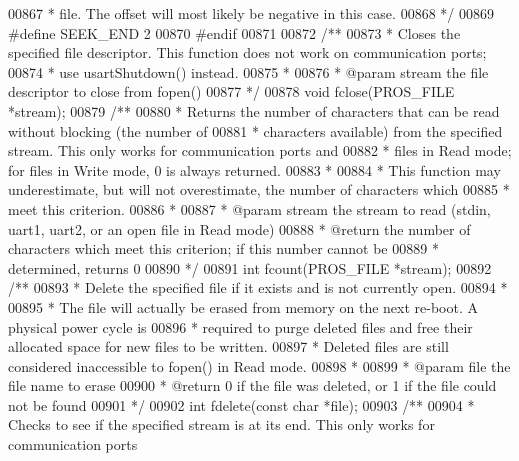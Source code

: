 \begin{DoxyCode}
00867 \textcolor{comment}{ * file. The offset will most likely be negative in this case.}
00868 \textcolor{comment}{ */}
00869 \textcolor{preprocessor}{#}\textcolor{preprocessor}{define}       \textcolor{preprocessor}{SEEK\_END} 2
00870 \textcolor{preprocessor}{#}\textcolor{preprocessor}{endif}
00871 
00872 \textcolor{comment}{/**}
00873 \textcolor{comment}{ * Closes the specified file descriptor. This function does not work on communication ports;}
00874 \textcolor{comment}{ * use usartShutdown() instead.}
00875 \textcolor{comment}{ *}
00876 \textcolor{comment}{ * @param stream the file descriptor to close from fopen()}
00877 \textcolor{comment}{ */}
00878 \textcolor{keywordtype}{void} fclose(PROS_FILE *stream);
00879 \textcolor{comment}{/**}
00880 \textcolor{comment}{ * Returns the number of characters that can be read without blocking (the number of}
00881 \textcolor{comment}{ * characters available) from the specified stream. This only works for communication ports and}
00882 \textcolor{comment}{ * files in Read mode; for files in Write mode, 0 is always returned.}
00883 \textcolor{comment}{ *}
00884 \textcolor{comment}{ * This function may underestimate, but will not overestimate, the number of characters which}
00885 \textcolor{comment}{ * meet this criterion.}
00886 \textcolor{comment}{ *}
00887 \textcolor{comment}{ * @param stream the stream to read (stdin, uart1, uart2, or an open file in Read mode)}
00888 \textcolor{comment}{ * @return the number of characters which meet this criterion; if this number cannot be}
00889 \textcolor{comment}{ * determined, returns 0}
00890 \textcolor{comment}{ */}
00891 \textcolor{keywordtype}{int} fcount(PROS_FILE *stream);
00892 \textcolor{comment}{/**}
00893 \textcolor{comment}{ * Delete the specified file if it exists and is not currently open.}
00894 \textcolor{comment}{ *}
00895 \textcolor{comment}{ * The file will actually be erased from memory on the next re-boot. A physical power cycle is}
00896 \textcolor{comment}{ * required to purge deleted files and free their allocated space for new files to be written.}
00897 \textcolor{comment}{ * Deleted files are still considered inaccessible to fopen() in Read mode.}
00898 \textcolor{comment}{ *}
00899 \textcolor{comment}{ * @param file the file name to erase}
00900 \textcolor{comment}{ * @return 0 if the file was deleted, or 1 if the file could not be found}
00901 \textcolor{comment}{ */}
00902 \textcolor{keywordtype}{int} fdelete(\textcolor{keyword}{const} \textcolor{keywordtype}{char} *file);
00903 \textcolor{comment}{/**}
00904 \textcolor{comment}{ * Checks to see if the specified stream is at its end. This only works for communication ports}

\end{DoxyCode}
